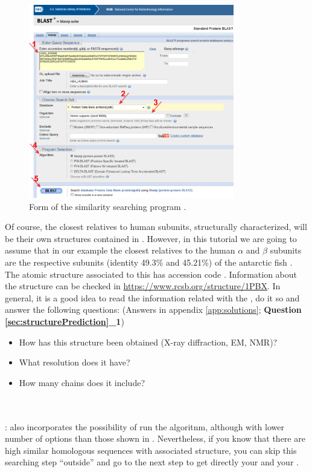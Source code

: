   \begin{figure}[H]
  \centering 
  \captionsetup{width=.7\linewidth} 
  \includegraphics[width=0.80\textwidth]{Images/Fig9}
  \caption{Form of the similarity searching program .}
  \label{fig:blastp}
  \end{figure}
  
  Of course, the closest relatives to human  subunits, structurally characterized, will be their own structures contained in . However, in this tutorial we are going to assume that in our example the closest relatives to the human  $\alpha$ and $\beta$ subunits are the respective  subunits (identity 49.3\% and 45.21\%) of the antarctic fish  \citep{camardella1992}. The atomic structure associated to this  has  accession code . Information about the structure can be checked in \url{https://www.rcsb.org/structure/1PBX}. In general, it is a good idea to read the information related with the , do it so and answer the following questions: (Answers in appendix \ref{app:solutions}; \textbf{Question \ref{sec:structurePrediction}\_1})
  
  \begin{minipage}{\linewidth}
    \begin{framed}
      \begin{itemize}
        \item How has this structure been obtained (X-ray diffraction, EM, NMR)?
        \item What resolution does it have?
        \item How many chains does it include?
      \end{itemize}
    \end{framed}
  \end{minipage}
\\
\\
  
  : \chimera also incorporates the possibility of run the  algoritnm, although with lower number of options than those shown in . Nevertheless, if you know that there are high similar homologous sequences with associated structure, you can skip this searching step ``outside'' \scipion and go to the next step to get directly your   and your .  
